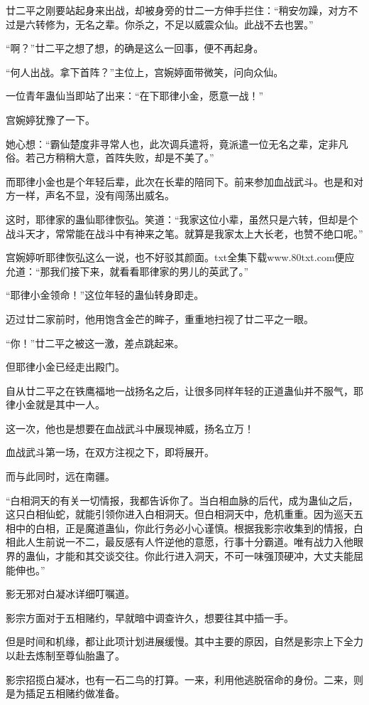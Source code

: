 \begin{this_body}
廿二平之刚要站起身来出战，却被身旁的廿二一方伸手拦住：“稍安勿躁，对方不过是六转修为，无名之辈。你杀之，不足以威震众仙。此战不去也罢。”

“啊？”廿二平之想了想，的确是这么一回事，便不再起身。

“何人出战。拿下首阵？”主位上，宫婉婷面带微笑，问向众仙。

一位青年蛊仙当即站了出来：“在下耶律小金，愿意一战！”

宫婉婷犹豫了一下。

她心想：“霸仙楚度非寻常人也，此次调兵遣将，竟派遣一位无名之辈，定非凡俗。若己方稍稍大意，首阵失败，却是不美了。”

而耶律小金也是个年轻后辈，此次在长辈的陪同下。前来参加血战武斗。也是和对方一样，声名不显，没有闯荡出威名。

这时，耶律家的蛊仙耶律恢弘。笑道：“我家这位小辈，虽然只是六转，但却是个战斗天才，常常能在战斗中有神来之笔。就算是我家太上大长老，也赞不绝口呢。”

宫婉婷听耶律恢弘这么一说，也不好驳其颜面。txt全集下载www.80txt.com便应允道：“那我们接下来，就看看耶律家的男儿的英武了。”

“耶律小金领命！”这位年轻的蛊仙转身即走。

迈过廿二家前时，他用饱含金芒的眸子，重重地扫视了廿二平之一眼。

“你！”廿二平之被这一激，差点跳起来。

但耶律小金已经走出殿门。

自从廿二平之在铁鹰福地一战扬名之后，让很多同样年轻的正道蛊仙并不服气，耶律小金就是其中一人。

这一次，他也是想要在血战武斗中展现神威，扬名立万！

血战武斗第一场，在双方注视之下，即将展开。

而与此同时，远在南疆。

“白相洞天的有关一切情报，我都告诉你了。当白相血脉的后代，成为蛊仙之后，这只白相仙蛇，就能引领你进入白相洞天。但白相洞天中，危机重重。因为巡天五相中的白相，正是魔道蛊仙，你此行务必小心谨慎。根据我影宗收集到的情报，白相此人生前说一不二，最反感有人忤逆他的意愿，行事十分霸道。唯有战力入他眼界的蛊仙，才能和其交谈交往。你此行进入洞天，不可一味强顶硬冲，大丈夫能屈能伸也。”

影无邪对白凝冰详细叮嘱道。

影宗方面对于五相赌约，早就暗中调查许久，想要往其中插一手。

但是时间和机缘，都让此项计划进展缓慢。其中主要的原因，自然是影宗上下全力以赴去炼制至尊仙胎蛊了。

影宗招揽白凝冰，也有一石二鸟的打算。一来，利用他逃脱宿命的身份。二来，则是为插足五相赌约做准备。


\end{this_body}
